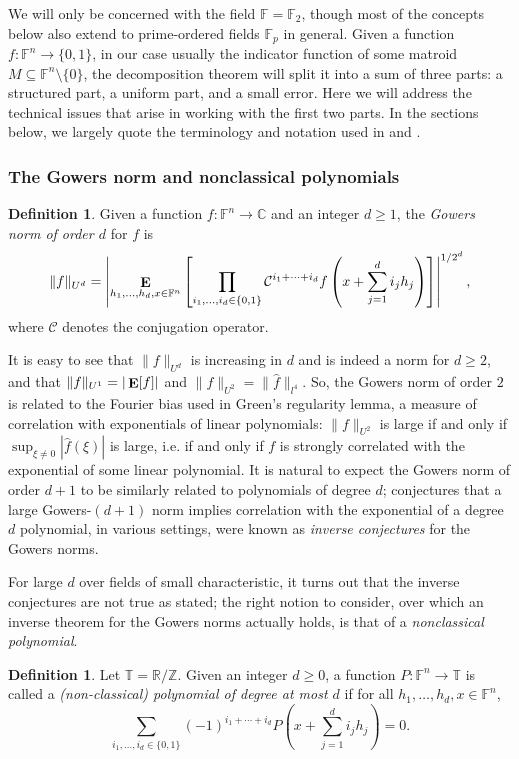 \documentclass{article}
\theoremstyle{plain}
\theoremstyle{definition}
\theoremstyle{definition}
\newtheorem{defn}[theorem]{Definition}
\theoremstyle{remark}
\numberwithin{equation}{section}
\newcommand{\CC}{\mathbb{C}}
\newcommand{\FF}{\mathbb{F}}
\newcommand{\RR}{\mathbb{R}}
\newcommand{\TT}{\mathbb{T}}
\newcommand{\ZZ}{\mathbb{Z}}
\newcommand{\Esymb}{{\bf E}}
\DeclareMathOperator*{\E}{\Esymb}
\begin{document}
We will only be concerned with the field $\FF=\FF_2$, though most of the concepts below also extend to prime-ordered fields $\FF_p$ in general. Given a function $f:\FF^n\rightarrow\{0,1\}$, in our case usually the indicator function of some matroid $M\subseteq \FF^n\setminus\{0\}$, the decomposition theorem will split it into a sum of three parts: a structured part, a uniform part, and a small error. Here we will address the technical issues that arise in working with the first two parts. In the sections below, we largely quote the terminology and notation used in \cite{VeryCountingMaybe} and \cite{hatamiRegCount}.

\subsubsection{The Gowers norm and nonclassical polynomials}

\begin{defn}
Given a function $f:\FF^n\rightarrow\CC$ and an integer $d\geq 1$, the \emph{Gowers norm of order $d$} for $f$ is
\[\|f\|_{U^d}=\left|\E_{h_1,\dots,h_d,x\in\FF^n}\left[\prod_{i_1,\dots,i_d\in\{0,1\}}\mathcal{C}^{i_1+\cdots+i_d}f\left(x + \sum_{j=1}^d i_j h_j\right)\right]\right|^{1/2^d},\]
where $\mathcal{C}$ denotes the conjugation operator.
\end{defn}

It is easy to see that $\|f\|_{U^d}$ is increasing in $d$ and is indeed a norm for $d\geq 2$, and that $\|f\|_{U^1}=|\E[f]|$ and $\|f\|_{U^2}=\|\hat{f}\|_{l^4}$. So, the Gowers norm of order $2$ is related to the Fourier bias used in Green's regularity lemma, a measure of correlation with exponentials of linear polynomials: $\|f\|_{U^2}$ is large if and only if $\sup_{\xi\neq 0}|\hat{f}(\xi)|$ is large, i.e. if and only if $f$ is strongly correlated with the exponential of some linear polynomial. It is natural to expect the Gowers norm of order $d+1$ to be similarly related to polynomials of degree $d$; conjectures that a large Gowers-$(d+1)$ norm implies correlation with the exponential of a degree $d$ polynomial, in various settings, were known as \emph{inverse conjectures} for the Gowers norms.

For large $d$ over fields of small characteristic, it turns out that the inverse conjectures are not true as stated; the right notion to consider, over which an inverse theorem for the Gowers norms actually holds, is that of a \emph{nonclassical polynomial}.

\begin{defn}
Let $\TT=\RR/\ZZ$. Given an integer $d\geq 0$, a function $P:\FF^n\rightarrow\TT$ is called a \emph{(non-classical) polynomial of degree at most $d$} if for all $h_1,\dots,h_d,x\in\FF^n$,
\[\sum_{i_1,\dots,i_d\in\{0,1\}}(-1)^{i_1+\cdots+i_d}P\left(x + \sum_{j=1}^d i_j h_j\right)=0.\]
\end{defn}
\end{document}
